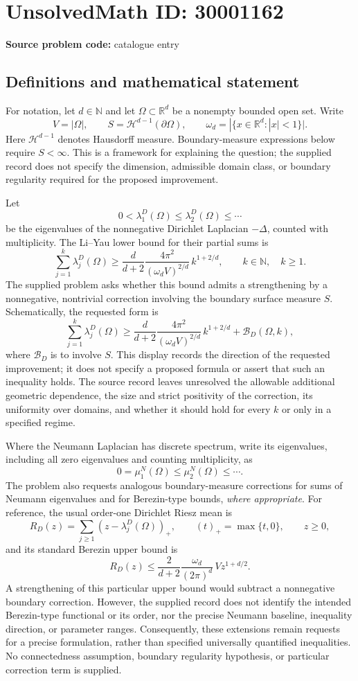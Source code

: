 \documentclass[11pt]{article}
\newcommand{\N}{\mathbb{N}}
\newcommand{\R}{\mathbb{R}}
\begin{document}
\section*{UnsolvedMath ID: 30001162}
\textbf{Source problem code:} catalogue entry
\subsection{Definitions and mathematical statement}
For notation, let \(d\in\N\) and let \(\Omega\subset\R^d\) be a nonempty bounded open set. Write
\[
V=|\Omega|,\qquad S=\mathcal H^{d-1}(\partial\Omega),\qquad \omega_d=|\{x\in\R^d:|x|<1\}|.
\]
Here \(\mathcal H^{d-1}\) denotes Hausdorff measure. Boundary-measure expressions below require \(S<\infty\). This is a framework for explaining the question; the supplied record does not specify the dimension, admissible domain class, or boundary regularity required for the proposed improvement.

Let
\[
0<\lambda_1^D(\Omega)\le\lambda_2^D(\Omega)\le\cdots
\]
be the eigenvalues of the nonnegative Dirichlet Laplacian \(-\Delta\), counted with multiplicity. The Li--Yau lower bound for their partial sums is
\[
\sum_{j=1}^{k}\lambda_j^D(\Omega)
\ge
\frac{d}{d+2}\frac{4\pi^2}{(\omega_d V)^{2/d}}\,k^{1+2/d},
\qquad k\in\N,\quad k\ge1.
\]
The supplied problem asks whether this bound admits a strengthening by a nonnegative, nontrivial correction involving the boundary surface measure \(S\). Schematically, the requested form is
\[
\sum_{j=1}^{k}\lambda_j^D(\Omega)
\ge
\frac{d}{d+2}\frac{4\pi^2}{(\omega_d V)^{2/d}}\,k^{1+2/d}
+\mathcal B_D(\Omega,k),
\]
where \(\mathcal B_D\) is to involve \(S\). This display records the direction of the requested improvement; it does not specify a proposed formula or assert that such an inequality holds. The source record leaves unresolved the allowable additional geometric dependence, the size and strict positivity of the correction, its uniformity over domains, and whether it should hold for every \(k\) or only in a specified regime.

Where the Neumann Laplacian has discrete spectrum, write its eigenvalues, including all zero eigenvalues and counting multiplicity, as
\[
0=\mu_1^N(\Omega)\le\mu_2^N(\Omega)\le\cdots.
\]
The problem also requests analogous boundary-measure corrections for sums of Neumann eigenvalues and for Berezin-type bounds, \emph{where appropriate}. For reference, the usual order-one Dirichlet Riesz mean is
\[
R_D(z)=\sum_{j\ge1}(z-\lambda_j^D(\Omega))_+,
\qquad (t)_+=\max\{t,0\},\qquad z\ge0,
\]
and its standard Berezin upper bound is
\[
R_D(z)\le
\frac{2}{d+2}\frac{\omega_d}{(2\pi)^d}\,V z^{1+d/2}.
\]
A strengthening of this particular upper bound would subtract a nonnegative boundary correction. However, the supplied record does not identify the intended Berezin-type functional or its order, nor the precise Neumann baseline, inequality direction, or parameter ranges. Consequently, these extensions remain requests for a precise formulation, rather than specified universally quantified inequalities. No connectedness assumption, boundary regularity hypothesis, or particular correction term is supplied.
\end{document}

